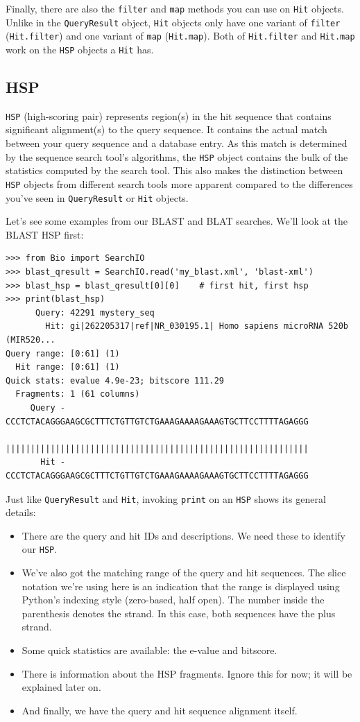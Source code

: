 \documentclass{report}
\begin{document}
Finally, there are also the \verb|filter| and \verb|map| methods you can use
on \verb|Hit| objects. Unlike in the \verb|QueryResult| object, \verb|Hit|
objects only have one variant of \verb|filter| (\verb|Hit.filter|) and one
variant of \verb|map| (\verb|Hit.map|). Both of \verb|Hit.filter| and
\verb|Hit.map| work on the \verb|HSP| objects a \verb|Hit| has.

\subsection{HSP}
\label{sec:searchio-hsp}

\verb|HSP| (high-scoring pair) represents region(s) in the hit sequence that
contains significant alignment(s) to the query sequence. It contains the actual
match between your query sequence and a database entry. As this match is
determined by the sequence search tool's algorithms, the \verb|HSP| object
contains the bulk of the statistics computed by the search tool. This also makes
the distinction between \verb|HSP| objects from different search tools more
apparent compared to the differences you've seen in \verb|QueryResult| or
\verb|Hit| objects.

Let's see some examples from our BLAST and BLAT searches. We'll look at the
BLAST HSP first:

\begin{verbatim}
>>> from Bio import SearchIO
>>> blast_qresult = SearchIO.read('my_blast.xml', 'blast-xml')
>>> blast_hsp = blast_qresult[0][0]    # first hit, first hsp
>>> print(blast_hsp)
      Query: 42291 mystery_seq
        Hit: gi|262205317|ref|NR_030195.1| Homo sapiens microRNA 520b (MIR520...
Query range: [0:61] (1)
  Hit range: [0:61] (1)
Quick stats: evalue 4.9e-23; bitscore 111.29
  Fragments: 1 (61 columns)
     Query - CCCTCTACAGGGAAGCGCTTTCTGTTGTCTGAAAGAAAAGAAAGTGCTTCCTTTTAGAGGG
             |||||||||||||||||||||||||||||||||||||||||||||||||||||||||||||
       Hit - CCCTCTACAGGGAAGCGCTTTCTGTTGTCTGAAAGAAAAGAAAGTGCTTCCTTTTAGAGGG
\end{verbatim}

Just like \verb|QueryResult| and \verb|Hit|, invoking \verb|print| on an
\verb|HSP| shows its general details:
\begin{itemize}
\item There are the query and hit IDs and descriptions. We need these to
    identify our \verb|HSP|.
\item We've also got the matching range of the query and hit sequences. The
    slice notation we're using here is an indication that the range is displayed
    using Python's indexing style (zero-based, half open). The number inside the
    parenthesis denotes the strand. In this case, both sequences have the plus
    strand.
\item Some quick statistics are available: the e-value and bitscore.
\item There is information about the HSP fragments. Ignore this for now; it will
    be explained later on.
\item And finally, we have the query and hit sequence alignment itself.
\end{itemize}
\end{document}
